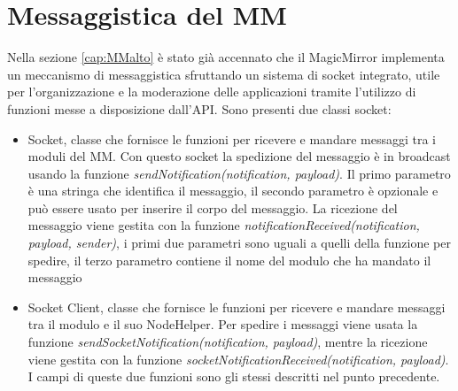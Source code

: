 \section{Messaggistica del MM}\label{cap:MMmess}
Nella sezione \ref{cap:MMalto} \`e stato gi\`a accennato che il MagicMirror implementa un meccanismo di messaggistica sfruttando un sistema di socket integrato,
utile per l'organizzazione e la moderazione delle applicazioni tramite l'utilizzo di funzioni messe a disposizione dall'API.
Sono presenti due classi socket:
\begin{itemize}
\item Socket, classe che fornisce le funzioni per ricevere e mandare messaggi tra i moduli del MM. Con questo socket la spedizione
del messaggio \`e in broadcast usando la funzione \textit{sendNotification(notification, payload)}. Il primo parametro \`e una stringa che identifica
il messaggio, il secondo parametro \`e opzionale e pu\`o essere usato per inserire il corpo del messaggio.
La ricezione del messaggio viene gestita con la funzione \textit{notificationReceived(notification, payload, sender)}, i primi due parametri sono
uguali a quelli della funzione per spedire, il terzo parametro contiene il nome del
modulo che ha mandato il messaggio
\item Socket Client, classe che fornisce le funzioni per ricevere e mandare messaggi tra il modulo e il suo NodeHelper. Per spedire
i messaggi viene usata la funzione \textit{sendSocketNotification(notification, payload)}, mentre la ricezione viene gestita con la funzione
 \textit{socketNotificationReceived(notification, payload)}. I campi di queste due funzioni sono gli stessi descritti nel punto precedente.\\[1\baselineskip]
\end{itemize}
